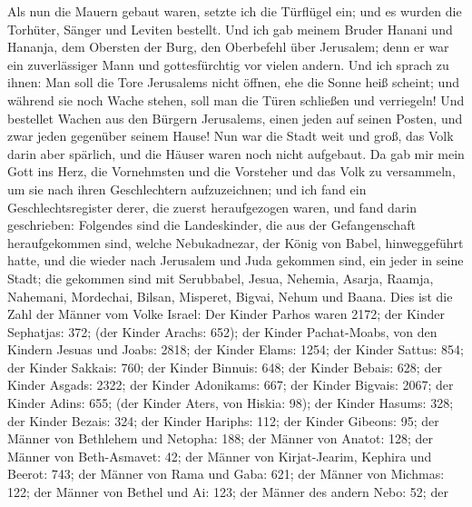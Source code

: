  Als nun die Mauern gebaut waren, setzte ich die Türflügel
ein; und es wurden die Torhüter, Sänger und Leviten bestellt.
 Und ich gab meinem Bruder Hanani und Hananja, dem
Obersten der Burg, den Oberbefehl über Jerusalem; denn er war ein
zuverlässiger Mann und gottesfürchtig vor vielen andern. 
Und ich sprach zu ihnen: Man soll die Tore Jerusalems nicht öffnen, ehe
die Sonne heiß scheint; und während sie noch Wache stehen, soll man die
Türen schließen und verriegeln! Und bestellet Wachen aus den Bürgern
Jerusalems, einen jeden auf seinen Posten, und zwar jeden gegenüber
seinem Hause!  Nun war die Stadt weit und groß, das Volk
darin aber spärlich, und die Häuser waren noch nicht aufgebaut.
 Da gab mir mein Gott ins Herz, die Vornehmsten und die
Vorsteher und das Volk zu versammeln, um sie nach ihren Geschlechtern
aufzuzeichnen; und ich fand ein Geschlechtsregister derer, die zuerst
heraufgezogen waren, und fand darin geschrieben: 
Folgendes sind die Landeskinder, die aus der Gefangenschaft
heraufgekommen sind, welche Nebukadnezar, der König von Babel,
hinweggeführt hatte, und die wieder nach Jerusalem und Juda gekommen
sind, ein jeder in seine Stadt;  die gekommen sind mit
Serubbabel, Jesua, Nehemia, Asarja, Raamja, Nahemani, Mordechai, Bilsan,
Misperet, Bigvai, Nehum und Baana. Dies ist die Zahl der Männer vom
Volke Israel:  Der Kinder Parhos waren 2172;
 der Kinder Sephatjas: 372; (der Kinder Arachs: 652);
 der Kinder Pachat-Moabs,  von den Kindern
Jesuas und Joabs: 2818;  der Kinder Elams: 1254;
 der Kinder Sattus: 854;  der Kinder
Sakkais: 760;  der Kinder Binnuis: 648; 
der Kinder Bebais: 628;  der Kinder Asgads: 2322;
 der Kinder Adonikams: 667;  der Kinder
Bigvais: 2067;  der Kinder Adins: 655; (der Kinder Aters,
von Hiskia: 98);  der Kinder Hasums: 328; 
der Kinder Bezais: 324;  der Kinder Hariphs: 112;
 der Kinder Gibeons: 95;  der Männer von
Bethlehem und Netopha: 188;  der Männer von Anatot: 128;
 der Männer von Beth-Asmavet: 42;  der
Männer von Kirjat-Jearim,  Kephira und Beerot: 743;
 der Männer von Rama und Gaba: 621;  der
Männer von Michmas: 122;  der Männer von Bethel und Ai:
123;  der Männer des andern Nebo: 52;  der
